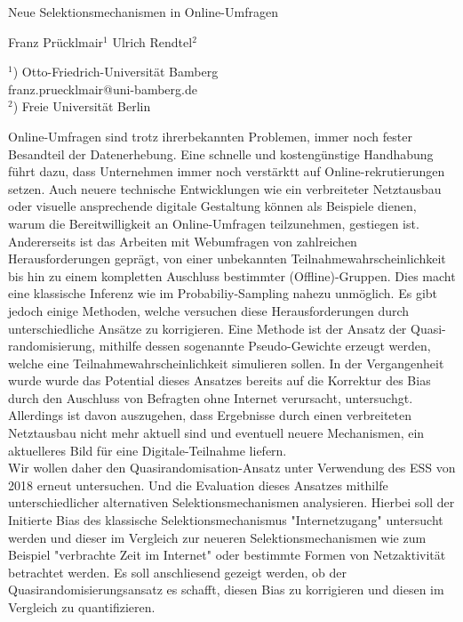 \documentclass[a4paper]{article}
\begin{document}

\Large
 \begin{center}
Neue Selektionsmechanismen in Online-Umfragen\\ 

\hspace{10pt}

\large
Franz Prücklmair$^1$ Ulrich Rendtel$^2$ \\

\hspace{10pt}

\small  
$^1$) Otto-Friedrich-Universität Bamberg\\
franz.pruecklmair@uni-bamberg.de\\
$^2$) Freie Universität Berlin

\end{center}

\hspace{10pt}

\normalsize

Online-Umfragen sind trotz ihrerbekannten Problemen, immer noch fester Besandteil der Datenerhebung. Eine schnelle und kostengünstige Handhabung führt dazu, dass Unternehmen immer noch verstärktt auf Online-rekrutierungen setzen. Auch neuere technische Entwicklungen wie ein verbreiteter Netztausbau oder visuelle ansprechende digitale Gestaltung können als Beispiele dienen, warum die Bereitwilligkeit an Online-Umfragen teilzunehmen, gestiegen ist.
\\


Andererseits ist das Arbeiten mit Webumfragen von zahlreichen Herausforderungen geprägt, von einer unbekannten Teilnahmewahrscheinlichkeit bis hin zu einem kompletten Auschluss bestimmter (Offline)-Gruppen. Dies macht eine klassische Inferenz wie im Probabiliy-Sampling nahezu unmöglich. Es gibt jedoch einige Methoden, welche versuchen diese Herausforderungen durch unterschiedliche Ansätze zu korrigieren. Eine Methode  ist der Ansatz der Quasi-randomisierung, mithilfe dessen sogenannte Pseudo-Gewichte erzeugt werden, welche eine Teilnahmewahrscheinlichkeit simulieren sollen. In der Vergangenheit wurde wurde das Potential dieses Ansatzes bereits auf die Korrektur des Bias durch den Auschluss von Befragten ohne Internet verursacht, untersuchgt. Allerdings ist davon auszugehen, dass Ergebnisse durch einen verbreiteten Netztausbau nicht mehr aktuell  sind und eventuell neuere Mechanismen, ein aktuelleres Bild für eine Digitale-Teilnahme liefern.
\\

Wir wollen daher den Quasirandomisation-Ansatz unter Verwendung des ESS von 2018 erneut untersuchen. Und die Evaluation dieses Ansatzes mithilfe unterschiedlicher alternativen Selektionsmechanismen analysieren. Hierbei soll der Initierte Bias des klassische Selektionsmechanismus "Internetzugang" untersucht werden und dieser im Vergleich zur neueren Selektionsmechanismen wie zum Beispiel "verbrachte Zeit im Internet" oder bestimmte Formen von Netzaktivität betrachtet werden. Es soll anschliesend gezeigt werden, ob der Quasirandomisierungsansatz es schafft, diesen Bias zu korrigieren und diesen im Vergleich zu quantifizieren. 
\end{document}
